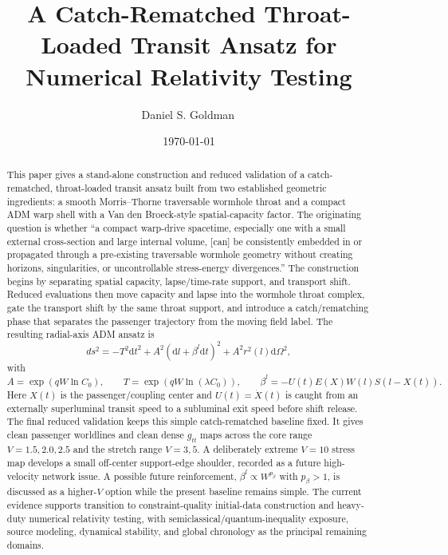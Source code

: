 \documentclass[11pt]{article}
\title{A Catch-Rematched Throat-Loaded Transit Ansatz for Numerical Relativity Testing}
\author[1]{Daniel S. Goldman\,\orcidlink{0000-0003-2835-3521}}
\affil[1]{Independent researcher; ORCID: \href{https://orcid.org/0000-0003-2835-3521}{0000-0003-2835-3521}}
\date{\today}
\newcommand{\dd}{\mathrm{d}}
\begin{document}
\maketitle

\begin{abstract}
This paper gives a stand-alone construction and reduced validation of a catch-rematched, throat-loaded transit ansatz built from two established geometric ingredients: a smooth Morris--Thorne traversable wormhole throat and a compact ADM warp shell with a Van den Broeck-style spatial-capacity factor.  The originating question is whether ``a compact warp-drive spacetime, especially one with a small external cross-section and large internal volume, [can] be consistently embedded in or propagated through a pre-existing traversable wormhole geometry without creating horizons, singularities, or uncontrollable stress-energy divergences.''  The construction begins by separating spatial capacity, lapse/time-rate support, and transport shift.  Reduced evaluations then move capacity and lapse into the wormhole throat complex, gate the transport shift by the same throat support, and introduce a catch/rematching phase that separates the passenger trajectory from the moving field label.  The resulting radial-axis ADM ansatz is
\begin{equation*}
 ds^2=-T^2\dd t^2 + A^2\left(\dd l+\beta^l\dd t\right)^2 + A^2r^2(l)\dd\Omega^2,
\end{equation*}
with
\begin{equation*}
 A=\exp\!\left(qW\ln C_0\right),\qquad
 T=\exp\!\left(qW\ln(\lambda C_0)\right),\qquad
 \beta^l=-U(t)E(X)W(l)S(l-X(t)).
\end{equation*}
Here $X(t)$ is the passenger/coupling center and $U(t)=\dot X(t)$ is caught from an externally superluminal transit speed to a subluminal exit speed before shift release.  The final reduced validation keeps this simple catch-rematched baseline fixed.  It gives clean passenger worldlines and clean dense $g_{tt}$ maps across the core range $V=1.5,2.0,2.5$ and the stretch range $V=3,5$.  A deliberately extreme $V=10$ stress map develops a small off-center support-edge shoulder, recorded as a future high-velocity network issue.  A possible future reinforcement, $\beta^l\propto W^{p_\beta}$ with $p_\beta>1$, is discussed as a higher-$V$ option while the present baseline remains simple.  The current evidence supports transition to constraint-quality initial-data construction and heavy-duty numerical relativity testing, with semiclassical/quantum-inequality exposure, source modeling, dynamical stability, and global chronology as the principal remaining domains.
\end{abstract}
\end{document}
